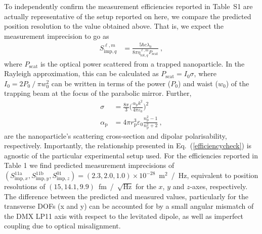 \documentclass[%
 reprint,
 amsmath,amssymb,
 aps,
pra,
]{revtex4-2}
\begin{document}
To independently confirm the measurement efficiencies reported in Table~S1 are actually representative of the setup reported on here, we compare the predicted position resolution to the value obtained above. That is, we expect the measurement imprecision to go as~\cite{dania_position_2022}
\begin{align}\label{efficiencycheck}
    S_{\mathrm{imp},q}^{\ell,m} &= \frac{5\hbar c\lambda_{0}}{8\pi\eta^{\ell,m}_{\mathrm{tot},q}P_{\mathrm{scat}}} ~ ,
\end{align}
where $P_{\mathrm{scat}}$ is the optical power scattered from a trapped nanoparticle. In the Rayleigh approximation, this can be calculated as $P_{\mathrm{scat}} = I_{0}\sigma$, where $I_{0} = 2P_{0}~/~\pi w_{0}^{2}$ can be written in terms of the power ($P_{0}$) and waist ($w_{0}$) of the trapping beam at the focus of the parabolic mirror. Further,
\begin{align}
    \sigma &= \frac{8\pi}{3}\Bigg(\frac{\alpha_{\mathrm{p}}k^{2}}{4\pi\varepsilon_{0}}\Bigg)^{2} \\
    \alpha_{\mathrm{p}} &= 4\pi r_{\mathrm{p}}^{3}\varepsilon_{0}\frac{n_{\mathrm{p}}^{2}-1}{n_{\mathrm{p}}^{2}+2} ~ ,
\end{align}
are the nanoparticle's scattering cross-section and dipolar polarisability, respectively. Importantly, the relationship presented in Eq.~(\ref{efficiencycheck}) is agnostic of the particular experimental setup used. For the efficiencies reported in Table 1 we find predicted measurement imprecisions of $(S_{\mathrm{imp}, x}^{11\mathrm{a}}, S_{\mathrm{imp}, y}^{11\mathrm{b}}, S_{\mathrm{imp}, z}^{01}) = (2.3, 2.0, 1.0) \times 10^{-28}$~m$^{2}$~/~Hz, equivalent to position resolutions of $(15, 14.1, 9.9)$~fm~/~$\sqrt{\mathrm{Hz}}$ for the $x$, $y$ and $z$-axes, respectively. The difference between the predicted and measured values, particularly for the transverse DOFs (x and y) can be accounted for by a small angular mismatch of the DMX LP11 axis with respect to the levitated dipole, as well as imperfect coupling due to optical misalignment.


\end{document}
